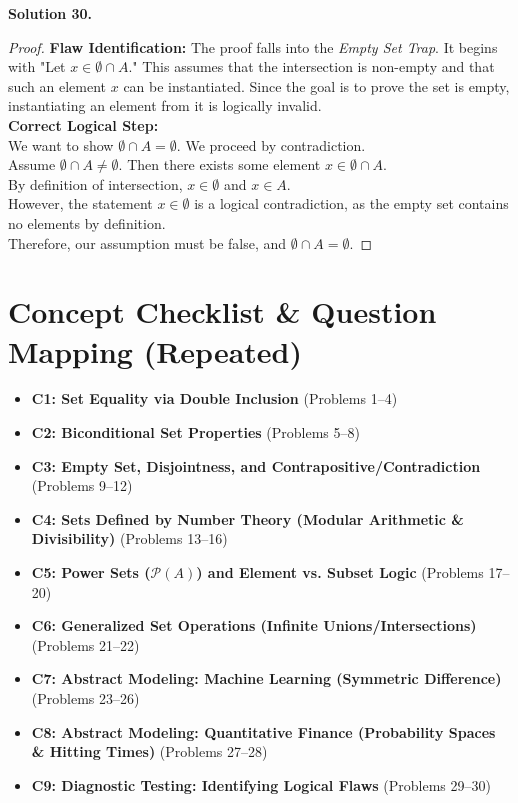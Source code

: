 \documentclass[11pt]{article}
\begin{document}
\noindent \textbf{Solution 30.}
\begin{proof}
\textbf{Flaw Identification:} The proof falls into the \textit{Empty Set Trap}. It begins with "Let $x \in \emptyset \cap A$." This assumes that the intersection is non-empty and that such an element $x$ can be instantiated. Since the goal is to prove the set is empty, instantiating an element from it is logically invalid. \\
\textbf{Correct Logical Step:} \\
We want to show $\emptyset \cap A = \emptyset$. We proceed by contradiction. \\
Assume $\emptyset \cap A \neq \emptyset$. Then there exists some element $x \in \emptyset \cap A$. \\
By definition of intersection, $x \in \emptyset$ and $x \in A$. \\
However, the statement $x \in \emptyset$ is a logical contradiction, as the empty set contains no elements by definition. \\
Therefore, our assumption must be false, and $\emptyset \cap A = \emptyset$.
\end{proof}

\newpage

\section{Concept Checklist \& Question Mapping (Repeated)}
\label{sec:mapping_end}
\begin{itemize}
    \item \textbf{C1: Set Equality via Double Inclusion} (Problems 1--4)
    \item \textbf{C2: Biconditional Set Properties} (Problems 5--8)
    \item \textbf{C3: Empty Set, Disjointness, and Contrapositive/Contradiction} (Problems 9--12)
    \item \textbf{C4: Sets Defined by Number Theory (Modular Arithmetic \& Divisibility)} (Problems 13--16)
    \item \textbf{C5: Power Sets ($\mathcal{P}(A)$) and Element vs. Subset Logic} (Problems 17--20)
    \item \textbf{C6: Generalized Set Operations (Infinite Unions/Intersections)} (Problems 21--22)
    \item \textbf{C7: Abstract Modeling: Machine Learning (Symmetric Difference)} (Problems 23--26)
    \item \textbf{C8: Abstract Modeling: Quantitative Finance (Probability Spaces \& Hitting Times)} (Problems 27--28)
    \item \textbf{C9: Diagnostic Testing: Identifying Logical Flaws} (Problems 29--30)
\end{itemize}
\end{document}

